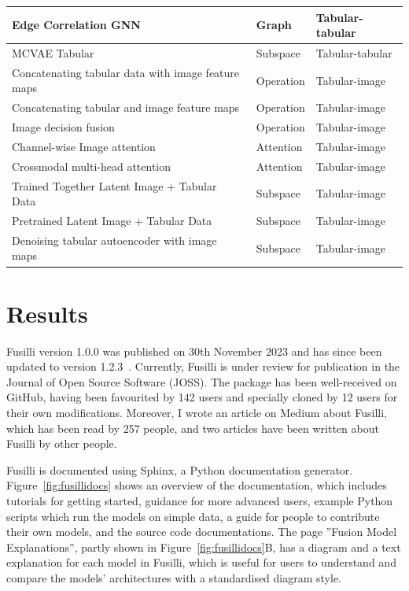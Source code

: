 \begin{table}[!ht]
\begin{tabular}{|p{8cm}ll|}
        Edge Correlation GNN & Graph & Tabular-tabular \\ \hline 
        MCVAE Tabular~\cite{antelmiSparseMultiChannelVariational2019}  & Subspace & Tabular-tabular \\ \hline
        Concatenating tabular data with image feature maps~\cite{liFusingMetadataDermoscopy2020}  & Operation & Tabular-image \\ \hline
        Concatenating tabular and image feature maps~\cite{gaoReducingUncertaintyCancer2022} & Operation & Tabular-image \\ \hline
        Image decision fusion & Operation & Tabular-image \\ \hline 
        Channel-wise Image attention~\cite{duanmuPredictionPathologicalComplete2020} & Attention & Tabular-image \\ \hline
        Crossmodal multi-head attention~\cite{golovanevskyMultimodalAttentionbasedDeep2022} & Attention & Tabular-image \\ \hline
        Trained Together Latent Image + Tabular Data~\cite{zhaoMultimodalDeepLearning2022} & Subspace & Tabular-image \\ \hline
        Pretrained Latent Image + Tabular Data~\cite{zhaoMultimodalDeepLearning2022} & Subspace & Tabular-image \\ \hline
        Denoising tabular autoencoder with image maps~\cite{yanRicherFusionNetwork2021} & Subspace & Tabular-image \\ \hline
    \end{tabular}
\end{table}

\section{Results}

Fusilli version 1.0.0 was published on 30th November 2023 and has since been updated to version 1.2.3~\cite{townendFlorencejtFusilliFusilli2024}.
Currently, Fusilli is under review for publication in the Journal of Open Source Software (JOSS).
The package has been well-received on GitHub, having been favourited by 142 users and specially cloned by 12 users for their own modifications.
Moreover, I wrote an article on Medium about Fusilli, which has been read by 257 people, and two articles have been written about Fusilli by other people.

Fusilli is documented using Sphinx, a Python documentation generator.
Figure~\ref{fig:fusillidocs} shows an overview of the documentation, which includes tutorials for getting started, guidance for more advanced users, example Python scripts which run the models on simple data, a guide for people to contribute their own models, and the source code documentations.
The page ''Fusion Model Explanations'', partly shown in Figure~\ref{fig:fusillidocs}B, has a diagram and a text explanation for each model in Fusilli, which is useful for users to understand and compare the models' architectures with a standardised diagram style.


